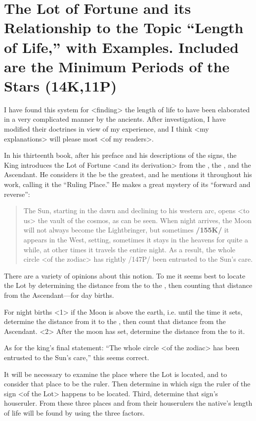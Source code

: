 \section{The Lot of Fortune and its Relationship to the Topic “Length of Life,” with Examples. Included are the Minimum Periods of the Stars (14K,11P)}

I have found this system for <finding> the length of life to have been elaborated in a very complicated manner by the ancients. After investigation, I have modified their doctrines in view of my experience, and I think <my explanations> will please most <of my readers>. 

In his thirteenth book, after his preface and his descriptions of the signs, the King introduces the Lot of Fortune <and its derivation> from the \Sun, the \Moon, and the Ascendant. He considers it the be the greatest, and he mentions it throughout his work, calling it the “Ruling Place.” He makes a great mystery of its “forward and reverse”: 
\begin{quote}
The Sun, starting in the dawn and declining to his western arc, opens <to us> the vault of the cosmos, as can be seen. When night arrives, the Moon will not always become the Lightbringer, but sometimes \textbf{/155K/} it appears in the West, setting, sometimes it stays in the heavens for quite a while, at other times it travels the entire night. As a result, the whole circle <of the zodiac> has rightly /147P/ been entrusted to the Sun’s care.
\end{quote}

There are a variety of opinions about this notion. To me it seems best to locate the Lot by determining the distance from the \Sun\xspace to the \Moon, then counting that distance from the Ascendant—for day births. 

For night births <1> if the Moon is above the earth, i.e. until the time it sets, determine the distance from it to the \Sun, then count that distance from the Ascendant. <2> After the moon has set, determine the distance from the \Sun\xspace to it. 

As for the king’s final statement: “The whole circle <of the
zodiac> has been entrusted to the Sun’s care,” this seems correct. 

It will be necessary to examine the place where the Lot is located, and to consider that place to be the ruler. Then determine in which sign the ruler of the sign <of the Lot> happens to be located. Third, determine that sign’s houseruler. From these three places and from their houserulers the native’s length of life will be found by using the three factors.

